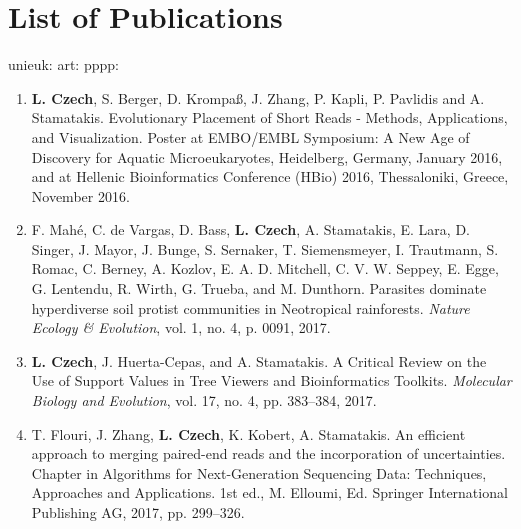 
\cleardoublepage

\chapter{List of Publications}
\label{ch:Publications}

unieuk: \cite{Berney2017}
art: \cite{Czech2018}
pppp: \cite{Czech2018a}

\begin{enumerate}
    \item \textbf{L. Czech}, S. Berger, D. Krompaß, J. Zhang, P. Kapli, P. Pavlidis and A. Stamatakis.
        Evolutionary Placement of Short Reads - Methods, Applications, and Visualization.
        Poster at EMBO/EMBL Symposium: A New Age of Discovery for Aquatic Microeukaryotes, Heidelberg, Germany, January 2016,
        and at Hellenic Bioinformatics Conference (HBio) 2016, Thessaloniki, Greece, November 2016.

    \item F. Mahé, C. de Vargas, D. Bass, \textbf{L. Czech}, A. Stamatakis, E. Lara, D. Singer, J. Mayor, J. Bunge,
        S. Sernaker, T. Siemensmeyer, I. Trautmann, S. Romac, C. Berney, A. Kozlov, E. A. D. Mitchell, C. V. W. Seppey,
        E. Egge, G. Lentendu, R. Wirth, G. Trueba, and M. Dunthorn.
        Parasites dominate hyperdiverse soil protist communities in Neotropical rainforests.
        \textit{Nature Ecology \& Evolution}, vol. 1, no. 4, p. 0091, 2017.

    \item \textbf{L. Czech}, J. Huerta-Cepas, and A. Stamatakis.
        A Critical Review on the Use of Support Values in Tree Viewers and Bioinformatics Toolkits.
        \textit{Molecular Biology and Evolution}, vol. 17, no. 4, pp. 383–384, 2017.

    \item T. Flouri, J. Zhang, \textbf{L. Czech}, K. Kobert, A. Stamatakis.
        An efficient approach to merging paired-end reads and the incorporation of uncertainties.
        Chapter in Algorithms for Next-Generation Sequencing Data: Techniques, Approaches and Applications.
        1st ed., M. Elloumi, Ed. Springer International Publishing AG, 2017, pp. 299–326.


\end{enumerate}
